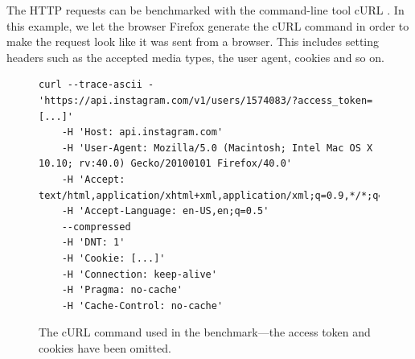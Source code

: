 \documentclass{cslthse-msc}
\begin{document}
The HTTP requests can be benchmarked with the command-line tool cURL \cite{curl}. In this example, we let the browser Firefox generate the cURL command in order to make the request look like it was sent from a browser. This includes setting headers such as the accepted media types, the user agent, cookies and so on.


\begin{figure}[H]
  \centering
\begin{lstlisting}[breaklines=true]
curl --trace-ascii - 'https://api.instagram.com/v1/users/1574083/?access_token=[...]' 
	-H 'Host: api.instagram.com' 
	-H 'User-Agent: Mozilla/5.0 (Macintosh; Intel Mac OS X 10.10; rv:40.0) Gecko/20100101 Firefox/40.0' 
	-H 'Accept: text/html,application/xhtml+xml,application/xml;q=0.9,*/*;q=0.8' 
	-H 'Accept-Language: en-US,en;q=0.5' 
	--compressed 
	-H 'DNT: 1' 
	-H 'Cookie: [...]' 
	-H 'Connection: keep-alive' 
	-H 'Pragma: no-cache' 
	-H 'Cache-Control: no-cache'
\end{lstlisting}
  \caption{The cURL command used in the benchmark---the access token and cookies have been omitted.}
\end{figure}

\clearpage
\end{document}
